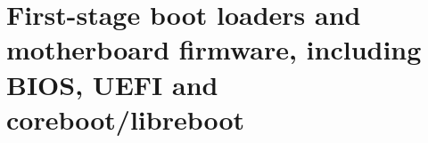 
\chapter{First-stage boot loaders and motherboard firmware, including BIOS, UEFI and coreboot/libreboot}

